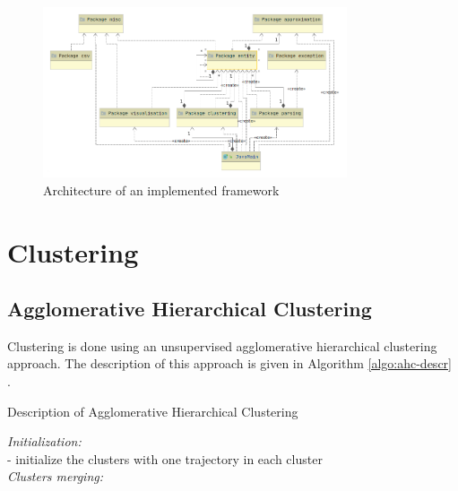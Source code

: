 \begin{figure}[!htb]
	\centering{}
	\includegraphics[width=0.8\textwidth]{images/proj-arch.png}
	\caption{Architecture of an implemented framework}
	\label{fig:proj-arch}
\end{figure}

\section{Clustering}

\subsection{Agglomerative Hierarchical Clustering}

Clustering is done using an unsupervised agglomerative hierarchical clustering approach. The description of this approach is given in Algorithm \ref{algo:ahc-descr} \cite{inproceedings:7_related_work}.

\begin{algorithm}[!htb]
	\caption{Description of Agglomerative Hierarchical Clustering}
	\label{algo:ahc-descr}
	\SetAlgoLined
	\textit{Initialization:} \\
	- initialize the clusters with one trajectory in each cluster \\
	\textit{Clusters merging:}\\
	
\end{algorithm}

